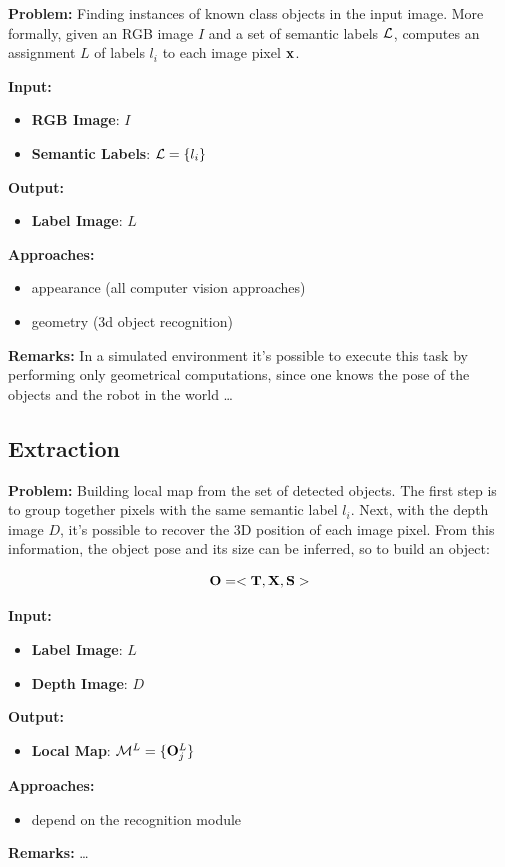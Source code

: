 \documentclass{article}
\begin{document}
	{\bf Problem: } Finding instances of known class objects in the input image. More formally, given an RGB image $I$ and a set of semantic labels $\mathcal{L}$, computes an assignment $L$ of labels $l_i$ to each image pixel $\mathbf{x}$.
	
	\noindent
	{\bf Input: }
	\begin{itemize}
		\item {\bf RGB Image}: $I$
		\item {\bf Semantic Labels}: $\mathcal{L} = \{l_i\}$
	\end{itemize}
	\noindent
	{\bf Output: }
	\begin{itemize}
		\item {\bf Label Image}: $L$
	\end{itemize}
	\noindent
	{\bf Approaches: }
	\begin{itemize}
		\item appearance (all computer vision approaches)
		\item geometry (3d object recognition)
	\end{itemize}
	\noindent
	{\bf Remarks: } In a simulated environment it's possible to execute this task by performing only geometrical computations, since one knows the pose of the objects and the robot in the world \dots
	
	\subsection{Extraction}
	
	{\bf Problem: } Building local map from the set of detected objects. The first step is to group together pixels with the same semantic label $l_i$. Next, with the depth image $D$, it's possible to recover the 3D position of each image pixel. From this information, the object pose and its size can be inferred, so to build an object:
	
	\begin{equation}
	 \mathbf{O} = < \mathbf{T}, \mathbf{X}, \mathbf{S} > 
	\end{equation}
	
	\noindent
	{\bf Input: }
	\begin{itemize}
		\item {\bf Label Image}: $L$
		\item {\bf Depth Image}: $D$
	\end{itemize}
	\noindent
	{\bf Output: }
	\begin{itemize}
		\item {\bf Local Map}: $\mathcal{M}^L = \{ \mathbf{O}_j^L \}$
	\end{itemize}
	\noindent
	{\bf Approaches: }
	\begin{itemize}
		\item depend on the recognition module
	\end{itemize}
	\noindent
	{\bf Remarks: } \dots
	
\end{document}

